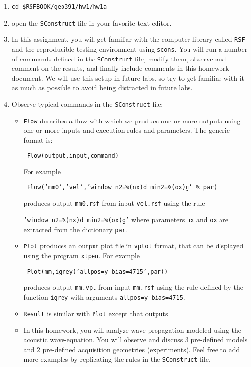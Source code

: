 \begin{enumerate}

\item \texttt{cd \$RSFBOOK/geo391/hw1/hw1a}

\item open the \texttt{SConstruct} file in your favorite text editor.

\item In this assignment, you will get familiar with 
the computer library called \texttt{RSF} and the reproducible testing
environment using \texttt{scons}.
You will run a number of commands defined in the 
\texttt{SConstruct} file, modify them, 
observe and comment on the results, and finally include comments
in this homework document.
We will use this setup in future labs, so try to get familiar with
it as much as possible to avoid being distracted in future labs.

\item Observe typical commands in the \texttt{SConstruct} file:
\begin{itemize}
\item \texttt{Flow} describes a flow with which we produce 
one or more outputs using one or more inputs and execution rules and
parameters. The generic format is:
\par
\texttt{ Flow(output,input,command) }
\par
For example
\par
\texttt{ Flow('mm0','vel','window n2=\%(nx)d min2=\%(ox)g' \% par)}
\par
produces output \texttt{mm0.rsf} from input \texttt{vel.rsf} using the rule
\par
\texttt{'window n2=\%(nx)d min2=\%(ox)g'} where parameters
\texttt{nx} and \texttt{ox} are extracted from the dictionary \texttt{par}.

\item \texttt{Plot} produces an output plot file 
in \texttt{vplot} format, that can be displayed using the program 
\texttt{xtpen}.
For example
\par
\texttt{ Plot(mm,igrey('allpos=y bias=4715',par))}
\par
produces output \texttt{mm.vpl} from input 
\texttt{mm.rsf} using the rule defined by the function 
\texttt{igrey} with arguments \texttt{allpos=y bias=4715}.

\item \texttt{Result} is similar with \texttt{Plot} except
that outputs

\item In this homework, you will analyze wave propagation modeled
using the acoustic wave-equation. 
You will observe and discuss $3$ pre-defined models and 
$2$ pre-defined acquisition geometries (experiments).
Feel free to add more examples by replicating the rules in the
\texttt{SConstruct} file.


\end{itemize}
\end{enumerate}
